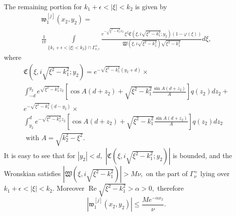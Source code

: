\documentclass[11pt]{article}
\newcommand\fw{\mathfrak w}
\newcommand\fW{\mathfrak W}
\newcommand\fC{\mathfrak C}
\renewcommand\Re{\operatorname{Re}}
\theoremstyle{definition}
\theoremstyle{remark}
\begin{document}
      The remaining portion for $k_1+\epsilon<|\xi|<k_2$ is given by
      \begin{multline}
      \fw^{[j]}_{1}(x_2,y_2)=\\
     \frac{1}{i\pi}\int\limits_{\{k_1+\epsilon<|\xi|<k_2\}\cap
       \Gamma_{\nu,\epsilon}^+}
     \frac{e^{-\sqrt{\xi^2-k_1^2}x_2}\,\xi^j
       \fC(\xi,i\sqrt{\xi^2-k_1^2};y_2)(1-\varphi(\xi))}
          {\fW(\xi,i\sqrt{\xi^2-k_1^2})\sqrt{\xi^2-k_1^2}}d\xi,  
      \end{multline}
      where
      \begin{multline}
        \fC(\xi,i\sqrt{\xi^2-k_1^2};y_2)=
        e^{-\sqrt{\xi^2-k_1^2}(y_2+d)}\times \\
        \int_{-d}^{y_2}e^{\sqrt{\xi^2-k_1^2}
          z_2}\left[\cos A(d+z_2)+\sqrt{\xi^2-k_1^2}\frac{\sin
            A(d+z_2)}{A}\right]q(z_2)dz_2+\\ e^{-\sqrt{\xi^2-k_1^2}(d-y_2)}\times \\
        \int_{y_2}^{d}e^{-\sqrt{\xi^2-k_1^2}z_2}\left[\cos
          A(d+z_2)+\sqrt{\xi^2-k_1^2}\frac{\sin
            A(d+z_2)}{A}\right]q(z_2)dz_2\\
        \text{ with }A=\sqrt{k_2^2-\xi^2}.
      \end{multline}
      It is easy to see that for $|y_2|<d,$ 
      $|\fC(\xi,i\sqrt{\xi^2-k_1^2};y_2)|$ is bounded, and  the Wronskian satisfies
      $|\fW(\xi,i\sqrt{\xi^2-k_1^2})|>M\nu,$ on the part of
      $\Gamma_{\nu}^+$ lying over $k_1+\epsilon<|\xi|<k_2.$ Moreover
      $\Re\sqrt{\xi^2-k_1^2}>\alpha>0,$  therefore
      \begin{equation}
        |\fw^{[j]}_{1}(x_2,y_2)|\leq
        \frac{Me^{-\alpha x_2}}{\nu}.
      \end{equation}
\end{document}
